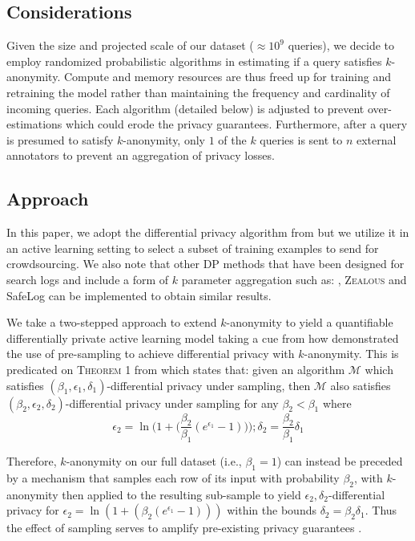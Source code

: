 \documentclass[letterpaper]{article}
\begin{document}
\subsection{Considerations} 
Given the size and projected scale of our dataset ($\approx 10^9$ queries), we decide to employ randomized probabilistic algorithms in estimating if a query satisfies $k$-anonymity. Compute and memory resources are thus freed up for training and retraining the model rather than maintaining the frequency and cardinality of incoming queries. Each algorithm (detailed below) is adjusted to prevent over-estimations which could erode the privacy guarantees. Furthermore, after a query is presumed to satisfy $k$-anonymity, only $1$ of the $k$ queries is sent to $n$ external annotators to prevent an aggregation of privacy losses. 

\subsection{Approach}
\label{approach}
In this paper, we adopt the differential privacy algorithm from \cite{li2012sampling} but we utilize it in an active learning setting to select a subset of training examples to send for crowdsourcing. We also note that other DP methods that have been designed for search logs and include a form of $k$ parameter aggregation such as: \cite{korolova2009releasing}, \textsc{Zealous} \cite{gotz2012publishing} and SafeLog \cite{zhang2016safelog} can be implemented to obtain similar results. 

We take a two-stepped approach to extend $k$-anonymity to yield a quantifiable differentially private active learning model taking a cue from how \cite{li2012sampling} demonstrated the use of pre-sampling to achieve differential privacy with $k$-anonymity. This is predicated on \textsc{Theorem 1} from \cite{li2012sampling} which states that: given an algorithm $\mathcal{M}$ which satisfies $(\beta_1, \epsilon_1, \delta_1)$-differential privacy under sampling, then $\mathcal{M}$ also satisfies $(\beta_2, \epsilon_2, \delta_2)$-differential privacy under sampling for any $\beta_2 < \beta_1$ where 
\begin{equation}
\epsilon_2 = \ln \Bigg(1 + \bigg(\frac{\beta_2}{\beta_1}(e^{\epsilon_1} - 1)\bigg)\Bigg); \delta_2 = \frac{\beta_2}{\beta_1}\delta_1
\end{equation}



Therefore, $k$-anonymity on our full dataset (i.e., $\beta_1 = 1$) can instead be preceded by a mechanism that samples each row of its input with probability $\beta_2$, with $k$-anonymity then applied to the resulting sub-sample to yield $\epsilon_2,\delta_2$-differential privacy for $\epsilon_2 = \ln(1 + (\beta_2(e^{\epsilon_1} - 1)))$ within the bounds $\delta_2 = \beta_2\delta_1$. Thus the effect of sampling serves to amplify pre-existing privacy guarantees \cite{balle2018privacy}.
\end{document}
